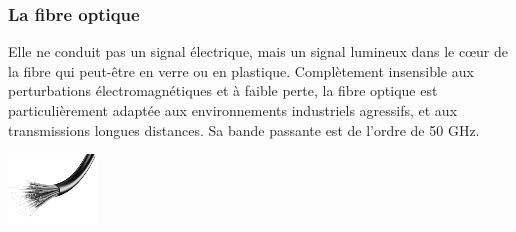 \documentclass[10pt]{article}
\begin{document}
\subsubsection*{La fibre optique}
\begin{minipage}[c]{.78\linewidth}
Elle ne conduit pas un signal électrique, mais un signal lumineux dans le cœur de la fibre qui peut-être en verre ou en plastique. Complètement insensible aux perturbations électromagnétiques et à faible perte, la fibre optique est particulièrement adaptée aux environnements industriels agressifs, et aux transmissions longues distances. Sa bande passante est de l’ordre de 50 GHz.
\end{minipage} \hfill
\begin{minipage}[c]{.2\linewidth}
\begin{center}
\includegraphics[width=.95\textwidth]{images/fig_10}
\end{center}
\end{minipage} 
\end{document}
